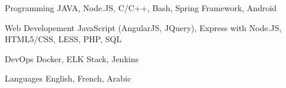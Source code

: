 

\begin{cvskills}


\cvskill
{Programming} %
{JAVA, Node.JS, C/C++, Bash, Spring Framework, Android} %


\cvskill
{Web Developement} %
{JavaScript (AngularJS, JQuery), Express with Node.JS, HTML5/CSS, LESS, PHP, SQL} %

\cvskill
{DevOps} %
{Docker, ELK Stack, Jenkins} %


\cvskill
{Languages} %
{English, French, Arabic} %


\end{cvskills}